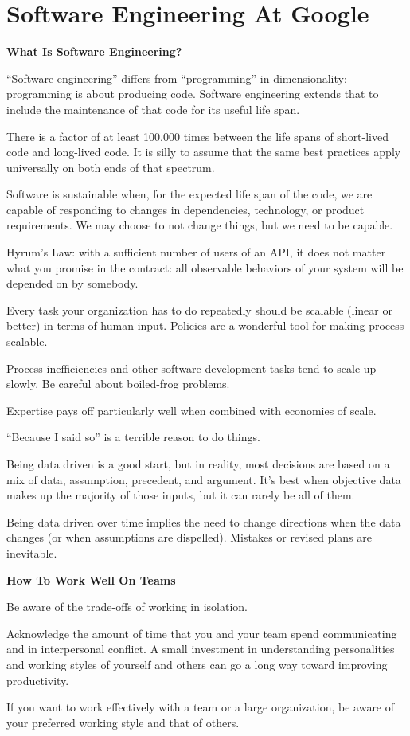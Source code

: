 \chapter{Software Engineering At Google}\label{ch:se_google}

\ben
\item \textbf{What Is Software Engineering?}
\bit
\item ``Software engineering'' differs from ``programming'' in dimensionality: programming is about producing code.
Software engineering extends that to include the maintenance of that code for its useful life span.
\item There is a factor of at least 100,000 times between the life spans of short-lived code and long-lived code. It
is silly to assume that the same best practices apply universally on both ends of that spectrum.
\item Software is sustainable when, for the expected life span of the code, we are capable of responding to changes
in dependencies, technology, or product requirements. We may choose to not change things, but we need to be capable.
\item Hyrum's Law: with a sufficient number of users of an API, it does not matter what you promise in the contract:
all observable behaviors of your system will be depended on by somebody.
\item Every task your organization has to do repeatedly should be scalable (linear or better) in terms of human input.
Policies are a wonderful tool for making process scalable.
\item Process inefficiencies and other software-development tasks tend to scale up slowly. Be careful about
boiled-frog problems.
\item Expertise pays off particularly well when combined with economies of scale.
\item ``Because I said so'' is a terrible reason to do things.
\item Being data driven is a good start, but in reality, most decisions are based on a mix of data, assumption,
precedent, and argument. It's best when objective data makes up the majority of those inputs, but it can rarely be
all of them.
\item Being data driven over time implies the need to change directions when the data changes (or when assumptions
are dispelled). Mistakes or revised plans are inevitable.
\eit


\item \textbf{How To Work Well On Teams}
\bit
\item Be aware of the trade-offs of working in isolation.
\item Acknowledge the amount of time that you and your team spend communicating and in interpersonal conflict. A
small investment in understanding personalities and working styles of yourself and others can go a long way toward
improving productivity.
\item If you want to work effectively with a team or a large organization, be aware of your preferred working style
and that of others.
\eit

